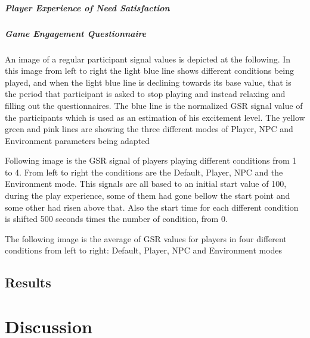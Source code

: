 \documentclass{uofsthesis-cs}
\begin{document}
\paragraph{Player Experience of Need Satisfaction}


\paragraph{Game Engagement Questionnaire}

An image of a regular participant signal values is depicted at
the following. In this image from left to right the light blue line
shows different conditions being played, and when the light blue
line is declining towards its base value, that is the period that
participant is asked to stop playing and instead relaxing and filling
out the questionnaires. The blue line is the normalized GSR signal
value of the participants which is used as an estimation of his
excitement level. The yellow green and pink lines are showing the
three different modes of Player, NPC and Environment parameters
being adapted

Following image is the GSR signal of players playing different
conditions from 1 to 4. From left to right the conditions are the
Default, Player, NPC and the Environment mode. This signals are all
based to an initial start value of 100, during the play experience,
some of them had gone bellow the start point and some other had risen
above that. Also the start time for each different condition is
shifted 500 seconds times the number of condition, from 0.

The following image is the average of GSR values for players in four
different conditions from left to right: Default, Player, NPC and
Environment modes

\section{Results}





\chapter{Discussion}
\label{chap:discus}
\end{document}
